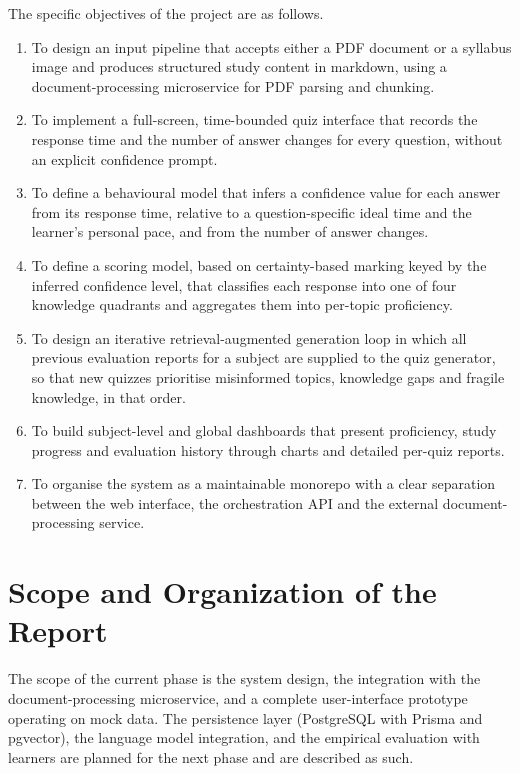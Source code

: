 \documentclass[12pt,a4paper,oneside]{report}
\begin{document}
The specific objectives of the project are as follows.
\begin{enumerate}
  \item To design an input pipeline that accepts either a PDF document or a
        syllabus image and produces structured study content in markdown,
        using a document-processing microservice for PDF parsing and
        chunking.
  \item To implement a full-screen, time-bounded quiz interface that records
        the response time and the number of answer changes for every
        question, without an explicit confidence prompt.
  \item To define a behavioural model that infers a confidence value for
        each answer from its response time, relative to a question-specific
        ideal time and the learner's personal pace, and from the number of
        answer changes.
  \item To define a scoring model, based on certainty-based marking keyed
        by the inferred confidence level, that
        classifies each response into one of four knowledge quadrants and
        aggregates them into per-topic proficiency.
  \item To design an iterative retrieval-augmented generation loop in which
        all previous evaluation reports for a subject are supplied to the
        quiz generator, so that new quizzes prioritise misinformed topics,
        knowledge gaps and fragile knowledge, in that order.
  \item To build subject-level and global dashboards that present
        proficiency, study progress and evaluation history through charts
        and detailed per-quiz reports.
  \item To organise the system as a maintainable monorepo with a clear
        separation between the web interface, the orchestration API and
        the external document-processing service.
\end{enumerate}

\section{Scope and Organization of the Report}

The scope of the current phase is the system design, the integration with
the document-processing microservice, and a complete user-interface
prototype operating on mock data. The persistence layer (PostgreSQL with
Prisma and pgvector), the language model integration, and the empirical
evaluation with learners are planned for the next phase and are described
as such.
\end{document}

